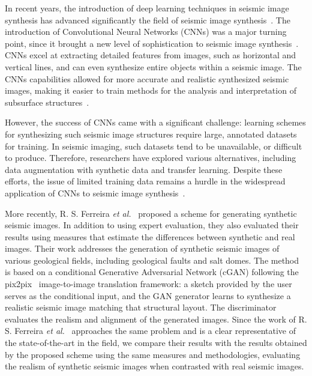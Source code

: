 \documentclass{ieeeaccess}
\begin{document}
In recent years, the introduction of deep learning techniques in seismic image synthesis has advanced significantly  the field of seismic image synthesis~\cite{Zeng2019}. The introduction of Convolutional Neural Networks (CNNs) was a major turning point, since it brought a new level of sophistication to seismic image synthesis~\cite{Powers2011}. CNNs excel at extracting detailed features from images, such as horizontal and vertical lines, and can even synthesize entire objects within a seismic image. The CNNs capabilities allowed for more accurate and realistic synthesized seismic images,  making it easier to train methods for the analysis and interpretation of subsurface structures~\cite{Powers2011}. 

However, the success of CNNs came with a significant challenge: learning schemes for synthesizing such seismic image structures require large, annotated datasets for training. In seismic imaging, such datasets tend to be unavailable, or difficult to produce. Therefore, researchers have explored various alternatives, including data augmentation with synthetic data and transfer learning. Despite these efforts, the issue of limited training data remains a hurdle in the widespread application of CNNs to seismic image synthesis~\cite{Wang2021}.

More recently, R. S. Ferreira \emph{et al.}~\cite{Ferreira2020} proposed a scheme for generating synthetic seismic images. In addition to using expert evaluation, they also evaluated their results using measures that estimate the differences between synthetic and real images. Their work addresses the generation of synthetic seismic images of various geological fields, including geological faults and salt domes. The method is based on a conditional Generative Adversarial Network (cGAN) following the pix2pix~\cite{pix2pix2017} image-to-image translation framework: a sketch provided by the user serves as the conditional input, and the GAN generator learns to synthesize a realistic seismic image matching that structural layout. The discriminator evaluates the realism and alignment of the generated images. Since the work of R. S. Ferreira \emph{et al.}~\cite{Ferreira2020} approaches the same problem and is a clear representative of the state-of-the-art in the field, we compare their results with the results obtained by the proposed scheme using the same measures and methodologies, evaluating the realism of synthetic seismic images when contrasted with real seismic images.
\end{document}
